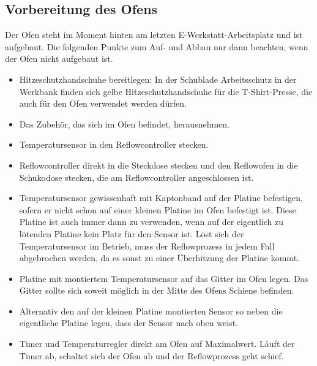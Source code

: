 \documentclass{\basedir/fablab-document}
\begin{document}
\subsection{Vorbereitung des Ofens}
Der Ofen steht im Moment hinten am letzten E-Werkstatt-Arbeitsplatz und ist aufgebaut. Die folgenden Punkte zum Auf- und Abbau nur dann beachten, wenn der Ofen nicht aufgebaut ist.
\begin{itemize}
	\item Hitzeschutzhandschuhe bereitlegen: In der Schublade Arbeitsschutz in der Werkbank finden sich gelbe Hitzeschutzhandschuhe für die T-Shirt-Presse, die auch für den Ofen verwendet werden dürfen.
	\item Das Zubehör, das sich im Ofen befindet, herausnehmen.
	\item Temperatursensor in den Reflowcontroller stecken.
	\item Reflowcontroller direkt in die Steckdose stecken und den Reflowofen in die Schukodose stecken, die am Reflowcontroller angeschlossen ist.
	\item Temperatursensor gewissenhaft mit Kaptonband auf der Platine befestigen, sofern er nicht schon auf einer kleinen Platine im Ofen befestigt ist. Diese Platine ist auch immer dann zu verwenden, wenn auf der eigentlich zu lötenden Platine kein Platz für den Sensor ist. Löst sich der Temperatursensor im Betrieb, muss der Reflowprozess in jedem Fall abgebrochen werden, da es sonst zu einer Überhitzung der Platine kommt.
	\item Platine mit montiertem Temperatursensor auf das Gitter im Ofen legen. Das Gitter sollte sich soweit möglich in der Mitte des Ofens Schiene befinden.
	\item Alternativ den auf der kleinen Platine montierten Sensor so neben die eigentliche Platine legen, dass der Sensor nach oben weist.
	\item Timer und Temperaturregler direkt am Ofen auf Maximalwert. Läuft der Timer ab, schaltet sich der Ofen ab und der Reflowprozess geht schief.
\end{itemize}
\end{document}
